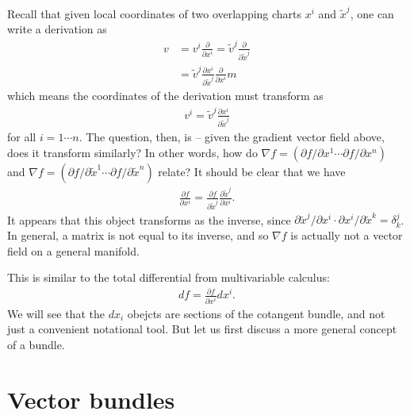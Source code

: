 \documentclass{../mathnotes}
\begin{document}
Recall that given local coordinates of two overlapping charts $x^i$ and $\tilde{x}^j$, one can write a derivation as
\begin{align*}
    v&=v^i\frac{\partial}{\partial x^i}=\tilde{v}^j\frac{\partial}{\partial \tilde{x}^j}\\
    &=\tilde{v}^j\frac{\partial x^i}{\partial \tilde{x}^j}\frac{\partial}{\partial x^i}m
\end{align*}
which means the coordinates of the derivation must transform as
\begin{align*}
    v^i=\tilde{v}^j\frac{\partial x^i}{\partial \tilde{x}^j}
\end{align*}
for all $i=1\cdots n$. The question, then, is -- given the gradient vector field above, does it transform similarly?
In other words, how do $\nabla f = \left( \partial f/\partial x^1 \cdots \partial f/\partial x^n \right)
$ and $\nabla f = \left( \partial f/\partial \tilde{x}^1 \cdots \partial f/\partial \tilde{x}^n \right)$ relate?
It should be clear that we have
\begin{align*}
    \frac{\partial f}{\partial x^i}=\frac{\partial f}{\partial \tilde{x}^j}\frac{\partial\tilde{x}^j}{\partial x^i}.
\end{align*}
It appears that this object transforms as the inverse, since
$\partial \tilde{x}^j/\partial x^i\cdot\partial x^i/\partial\tilde{x}^k=\delta^j_k$.
In general, a matrix is not equal to its inverse, and so $\nabla f$ is actually not a vector field on a general manifold.

This is similar to the total differential from multivariable calculus:
\begin{align*}
    df=\frac{\partial f}{\partial x^i}dx^i.
\end{align*}
We will see that the $dx_i$ obejcts are sections of the cotangent bundle, and not just a convenient notational tool.
But let us first discuss a more general concept of a bundle.

\section{Vector bundles}
\end{document}
